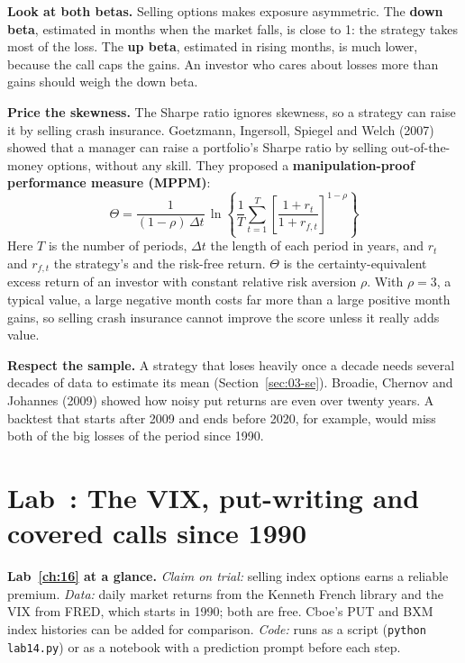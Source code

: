 \textbf{Look at both betas.} Selling options makes exposure asymmetric. The \textbf{down beta}, estimated in months when the market falls, is close to 1: the strategy takes most of the loss. The \textbf{up beta}, estimated in rising months, is much lower, because the call caps the gains. An investor who cares about losses more than gains should weigh the down beta.

\textbf{Price the skewness.} The Sharpe ratio ignores skewness, so a strategy can raise it by selling crash insurance. Goetzmann, Ingersoll, Spiegel and Welch (2007) showed that a manager can raise a portfolio's Sharpe ratio by selling out-of-the-money options, without any skill. They proposed a \textbf{manipulation-proof performance measure (MPPM)}:
\begin{equation}
  \Theta = \frac{1}{(1 - \rho)\,\Delta t}\,\ln\!\left\{\frac{1}{T}\sum_{t=1}^{T}\left[\frac{1 + r_t}{1 + r_{f,t}}\right]^{1-\rho}\right\}
  \label{eq:16-mppm}
\end{equation}
Here $T$ is the number of periods, $\Delta t$ the length of each period in years, and $r_t$ and $r_{f,t}$ the strategy's and the risk-free return. $\Theta$ is the certainty-equivalent excess return of an investor with constant relative risk aversion $\rho$. With $\rho = 3$, a typical value, a large negative month costs far more than a large positive month gains, so selling crash insurance cannot improve the score unless it really adds value.

\textbf{Respect the sample.} A strategy that loses heavily once a decade needs several decades of data to estimate its mean (Section~\ref{sec:03-se}). Broadie, Chernov and Johannes (2009) showed how noisy put returns are even over twenty years. A backtest that starts after 2009 and ends before 2020, for example, would miss both of the big losses of the period since 1990.

\section{Lab~\thechapter: The VIX, put-writing and covered calls since 1990}
\label{sec:16-lab}

\begin{callout}
\textbf{Lab~\ref{ch:16} at a glance.} \emph{Claim on trial:} selling index options earns a reliable premium. \emph{Data:} daily market returns from the Kenneth French library and the VIX from FRED, which starts in 1990; both are free. Cboe's PUT and BXM index histories can be added for comparison. \emph{Code:} runs as a script (\texttt{python lab14.py}) or as a notebook with a prediction prompt before each step.
\end{callout}

